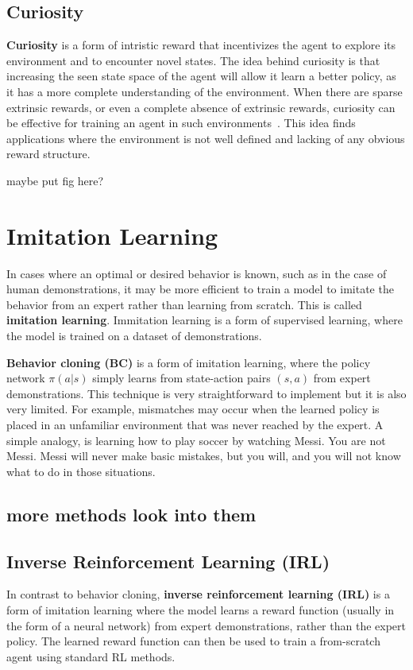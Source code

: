 \documentclass[12pt]{report}
\theoremstyle{definition}
\theoremstyle{remark}
\begin{document}
\subsection{Curiosity}
\textbf{Curiosity} is a form of intristic reward that incentivizes the agent to explore its environment and to encounter novel states. The idea behind curiosity is that increasing the seen state space of the agent will allow it learn a better policy, as it has a more complete understanding of the environment. When there are sparse extrinsic rewards, or even a complete absence of extrinsic rewards, curiosity can be effective for training an agent in such environments~\cite{pathak_curiosity-driven_2017}. This idea finds applications where the environment is not well defined and lacking of any obvious reward structure.

maybe put fig here?

\section{Imitation Learning}
In cases where an optimal or desired behavior is known, such as in the case of human demonstrations, it may be more efficient to train a model to imitate the behavior from an expert rather than learning from scratch. This is called \textbf{imitation learning}. Immitation learning is a form of supervised learning, where the model is trained on a dataset of demonstrations.

\textbf{Behavior cloning (BC)} is a form of imitation learning, where the policy network $\pi(a|s)$ simply learns from state-action pairs $(s, a)$ from expert demonstrations. This technique is very straightforward to implement but it is also very limited. For example, mismatches may occur when the learned policy is placed in an unfamiliar environment that was never reached by the expert. A simple analogy, is learning how to play soccer by watching Messi. You are not Messi. Messi will never make basic mistakes, but you will, and you will not know what to do in those situations.

\subsection{more methods look into them}

\subsection{Inverse Reinforcement Learning (IRL)}
In contrast to behavior cloning, \textbf{inverse reinforcement learning (IRL)} is a form of imitation learning where the model learns a reward function (usually in the form of a neural network) from expert demonstrations, rather than the expert policy. The learned reward function can then be used to train a from-scratch agent using standard RL methods.
\cite{arora_survey_2021}
\end{document}
